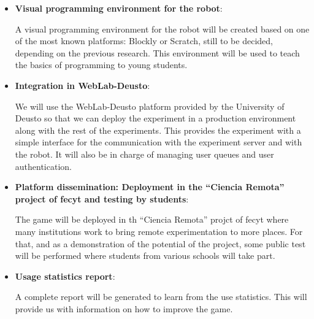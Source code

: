 \begin{itemize}
\item \textbf{Visual programming environment for the robot}:

A visual programming environment for the robot will be created based on one of the most known
platforms: Blockly or Scratch, still to be decided, depending on the previous research. This
environment will be used to teach the basics of programming to young students.

\item \textbf{Integration in WebLab-Deusto}:

We will use the WebLab-Deusto platform provided by the University of Deusto so that we can deploy
the experiment in a production environment along with the rest of the experiments. This provides the
experiment with a simple interface for the communication with the experiment server and with the
robot. It will also be in charge of managing user queues and user authentication.

\item \textbf{Platform dissemination: Deployment in the ``Ciencia Remota'' project of
\acrshort{fecyt} and testing by students}:

The game will be deployed in th ``Ciencia Remota'' projct of \acrshort{fecyt} where many
institutions work to bring remote experimentation to more places. For that, and as a demonstration
of the potential of the project, some public test will be performed where students from various
schools will take part.

\item \textbf{Usage statistics report}:

A complete report will be generated to learn from the use statistics. This will provide us with
information on how to improve the game.

\end{itemize}
